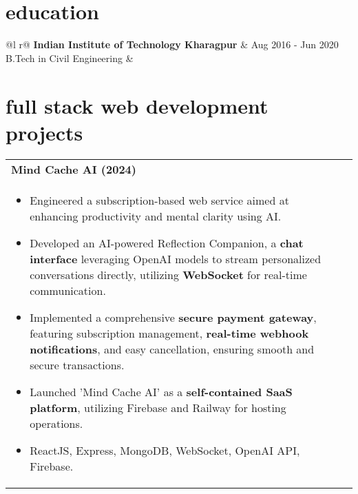 \documentclass[a4paper,8pt]{article}
\begin{document}
\vspace{4 pt}

\section{education}
\begin{tabularx}{\linewidth}{ @{}l r@{} }
\color[HTML]{1C033C} \textbf{Indian Institute of Technology Kharagpur} & \hfill \color[HTML]{371e77} Aug 2016 - Jun 2020 \\
\color[HTML]{371e77} B.Tech in Civil Engineering & \hfill \color[HTML]{4B28A4} \textit{\textbf{}} \\
\end{tabularx}

\vspace{-8pt}

\section{full stack web development projects}
\begin{tabularx}{\linewidth}{ @{}l r@{} }
\textbf{{Mind Cache AI (2024)}} \hfill \color[HTML]{371e77} \\[1pt]
\begin{minipage}[t]{\linewidth}
    \begin{itemize}[nosep,after=\strut, leftmargin=2em, itemsep=2pt]
        \item Engineered a subscription-based web service aimed at enhancing productivity and mental clarity using AI.
        \item Developed an AI-powered Reflection Companion, a \textbf{chat interface} leveraging OpenAI models to stream personalized conversations directly, utilizing \textbf{WebSocket} for real-time communication.
        \item Implemented a comprehensive \textbf{secure payment gateway}, featuring subscription management, \textbf{real-time webhook notifications}, and easy cancellation, ensuring smooth and secure transactions.
        \item Launched 'Mind Cache AI' as a \textbf{self-contained SaaS platform}, utilizing Firebase and Railway for hosting operations.
        \item ReactJS, Express, MongoDB, WebSocket, OpenAI API, Firebase.
    \end{itemize}
\end{minipage}
\end{tabularx}
\end{document}
